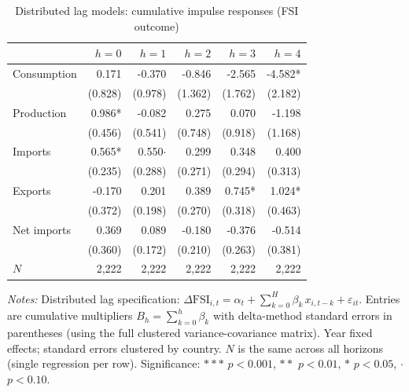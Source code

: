 
\begin{table}[htbp]
\centering
\caption{Distributed lag models: cumulative impulse responses (FSI outcome)}
\label{tab:agg-dl}
\begin{threeparttable}
\small
\begin{tabular}{lrrrrr}
\toprule
  & $h=0$ & $h=1$ & $h=2$ & $h=3$ & $h=4$ \\
\midrule
Consumption & 0.171 & -0.370 & -0.846 & -2.565 & -4.582* \\
   & (0.828) & (0.978) & (1.362) & (1.762) & (2.182) \\[4pt]
Production & 0.986* & -0.082 & 0.275 & 0.070 & -1.198 \\
   & (0.456) & (0.541) & (0.748) & (0.918) & (1.168) \\[4pt]
Imports & 0.565* & 0.550$\cdot$ & 0.299 & 0.348 & 0.400 \\
   & (0.235) & (0.288) & (0.271) & (0.294) & (0.313) \\[4pt]
Exports & -0.170 & 0.201 & 0.389 & 0.745* & 1.024* \\
   & (0.372) & (0.198) & (0.270) & (0.318) & (0.463) \\[4pt]
Net imports & 0.369 & 0.089 & -0.180 & -0.376 & -0.514 \\
   & (0.360) & (0.172) & (0.210) & (0.263) & (0.381) \\[4pt]
\midrule
$N$ & 2,222 & 2,222 & 2,222 & 2,222 & 2,222 \\
\bottomrule
\end{tabular}
\begin{tablenotes}\small
\item \textit{Notes:} Distributed lag specification: $\Delta\text{FSI}_{i,t} = \alpha_t + \sum_{k=0}^{H}\beta_k\,x_{i,t-k} + \varepsilon_{it}$. Entries are cumulative multipliers $B_h = \sum_{k=0}^{h}\beta_k$ with delta-method standard errors in parentheses (using the full clustered variance-covariance matrix). Year fixed effects; standard errors clustered by country. $N$ is the same across all horizons (single regression per row). Significance: $***$ $p<0.001$, $**$ $p<0.01$, $*$ $p<0.05$, $\cdot$ $p<0.10$.
\end{tablenotes}
\end{threeparttable}
\end{table}
